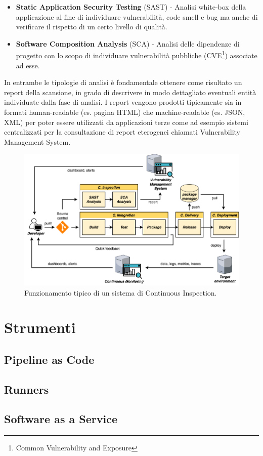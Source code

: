 \begin{itemize}
    \item \textbf{Static Application Security Testing} (SAST) - Analisi white-box della applicazione al fine di individuare vulnerabilità, code smell e bug ma anche di verificare il rispetto di un certo livello di qualità.
    \item \textbf{Software Composition Analysis} (SCA) - Analisi delle dipendenze di progetto con lo scopo di individuare vulnerabilità pubbliche (CVE\footnote{Common Vulnerability and Exposure}) associate ad esse.
\end{itemize}

In entrambe le tipologie di analisi è fondamentale ottenere come risultato un report della scansione, in grado di descrivere in modo dettagliato eventuali entità individuate dalla fase di analisi. I report vengono prodotti tipicamente sia in formati human-readable (es. pagina HTML) che machine-readable (es. JSON, XML) per poter essere utilizzati da applicazioni terze come ad esempio sistemi centralizzati per la consultazione di report eterogenei chiamati Vulnerability Management System.

\begin{figure}[H]
    \centering
    \includegraphics[width=1\textwidth]{img/cinspection-pipeline.png}
    \caption{Funzionamento tipico di un sistema di Continuous Inspection.}
    \label{ci-inspection-pipeline}
\end{figure}

\section{Strumenti}
\label{devops-tools-sec}

\subsection{Pipeline as Code}

\subsection{Runners}


\subsection{Software as a Service}
